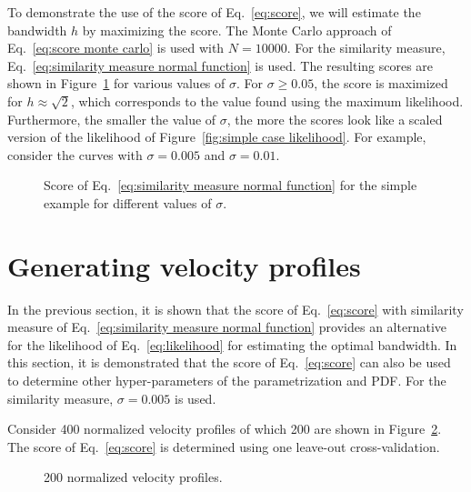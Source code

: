 \documentclass[10pt,final,a4paper,oneside,onecolumn]{article}
\newlength\figurewidth
\newlength\figureheight
\theoremstyle{plain}\newtheorem{definition}{Definition}[section]    %
\theoremstyle{definition}\newtheorem{example}{Example}[section]     %
\theoremstyle{remark}\newtheorem{remarkenv}{Remark}[section]        %
\begin{document}
To demonstrate the use of the score of Eq.~\eqref{eq:score}, we will estimate the bandwidth $h$ by maximizing the score. The Monte Carlo approach of Eq.~\eqref{eq:score monte carlo} is used with $N=10000$. For the similarity measure, Eq.~\eqref{eq:similarity measure normal function} is used. The resulting scores are shown in Figure~\ref{fig:simple case scores} for various values of $\sigma$. For $\sigma \geq 0.05$, the score is maximized for $h \approx \sqrt{2}$, which corresponds to the value found using the maximum likelihood. Furthermore, the smaller the value of $\sigma$, the more the scores look like a scaled version of the likelihood of Figure~\ref{fig:simple case likelihood}. For example, consider the curves with $\sigma=0.005$ and $\sigma=0.01$.

\begin{figure}
	\centering
	\setlength\figureheight{200pt}
	\setlength\figurewidth{300pt}
	
	\caption{Score of Eq.~\eqref{eq:similarity measure normal function} for the simple example for different values of $\sigma$.}
	\label{fig:simple case scores}
\end{figure}


\section{Generating velocity profiles}
\label{sec:generating profiles}

In the previous section, it is shown that the score of Eq.~\eqref{eq:score} with similarity measure of Eq.~\eqref{eq:similarity measure normal function} provides an alternative for the likelihood of Eq.~\eqref{eq:likelihood} for estimating the optimal bandwidth. In this section, it is demonstrated that the score of Eq.~\eqref{eq:score} can also be used to determine other hyper-parameters of the parametrization and PDF. For the similarity measure, $\sigma=0.005$ is used.

Consider 400 normalized velocity profiles of which 200 are shown in Figure~\ref{fig:velocity profiles}. The score of Eq.~\eqref{eq:score} is determined using one leave-out cross-validation.

\begin{figure}
	\centering
	\setlength\figureheight{200pt}
	\setlength\figurewidth{300pt}
	
	\caption{200 normalized velocity profiles.}
	\label{fig:velocity profiles}
\end{figure}
\end{document}
